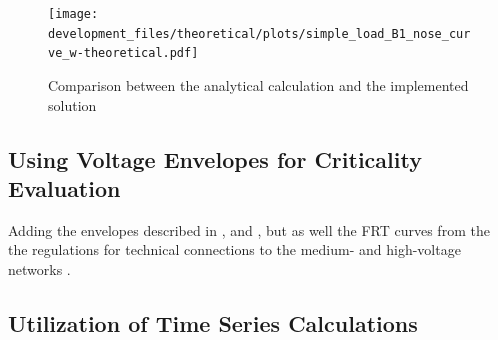 \begin{figure}[htbp!]
        \centering
        \texttt{[image: development\_files/theoretical/plots/simple\_load\_B1\_nose\_curve\_w-theoretical.pdf]}
        \caption[Comparison between the analytical calculation and the implemented solution]{Comparison between the analytical calculation and the implemented solution}
        \label{fig:nose-curve-simple-comp}
\end{figure}



\subsection{Using Voltage Envelopes for Criticality Evaluation}
\label{sec:comb-rating-tool}


Adding the envelopes described in \textcite{scheiner_2022}, and \textcite{wildenhues_2015}, but as well the \acs{FRT} curves from the the regulations for technical connections to the medium- and high-voltage networks \autocite{vde-tar_2018,vde-tar_2023}.

\subsection{Utilization of Time Series Calculations}
\label{sec:voltage-stability-time-series}

